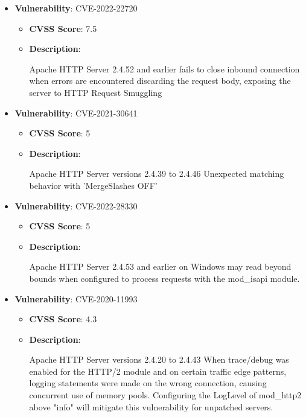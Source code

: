 \documentclass{article}
\begin{document}
\begin{itemize}
        \item \textbf{Vulnerability}: CVE-2022-22720
        \begin{itemize}
            \item \textbf{CVSS Score}:  7.5 
            \item \textbf{Description}:
            \parbox[t]{0.9\linewidth}{
                \ttfamily Apache HTTP Server 2.4.52 and earlier fails to close inbound connection when errors are encountered discarding the request body, exposing the server to HTTP Request Smuggling
            }
        \end{itemize}
    
        \item \textbf{Vulnerability}: CVE-2021-30641
        \begin{itemize}
            \item \textbf{CVSS Score}:  5 
            \item \textbf{Description}:
            \parbox[t]{0.9\linewidth}{
                \ttfamily Apache HTTP Server versions 2.4.39 to 2.4.46 Unexpected matching behavior with 'MergeSlashes OFF'
            }
        \end{itemize}
    
        \item \textbf{Vulnerability}: CVE-2022-28330
        \begin{itemize}
            \item \textbf{CVSS Score}:  5 
            \item \textbf{Description}:
            \parbox[t]{0.9\linewidth}{
                \ttfamily Apache HTTP Server 2.4.53 and earlier on Windows may read beyond bounds when configured to process requests with the mod\_isapi module.
            }
        \end{itemize}
    
        \item \textbf{Vulnerability}: CVE-2020-11993
        \begin{itemize}
            \item \textbf{CVSS Score}:  4.3 
            \item \textbf{Description}:
            \parbox[t]{0.9\linewidth}{
                \ttfamily Apache HTTP Server versions 2.4.20 to 2.4.43 When trace/debug was enabled for the HTTP/2 module and on certain traffic edge patterns, logging statements were made on the wrong connection, causing concurrent use of memory pools. Configuring the LogLevel of mod\_http2 above "info" will mitigate this vulnerability for unpatched servers.
            }
        \end{itemize}
    

\end{itemize}
\end{document}

